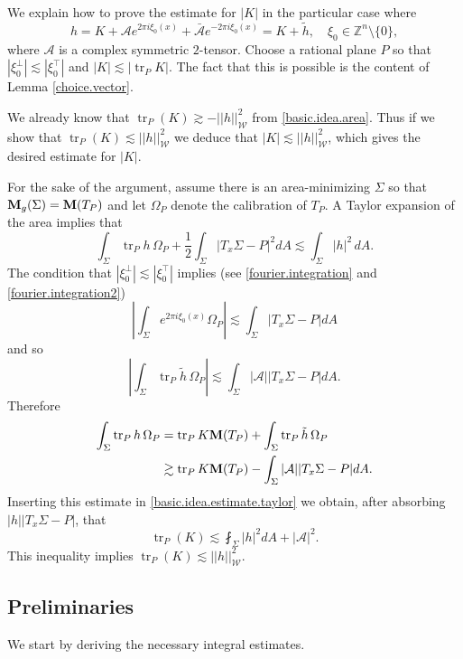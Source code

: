 \documentclass[11pt]{amsart}
\def\Z{\mathbb Z}
\def\tr{\operatorname{tr}}
\theoremstyle{remark}
\theoremstyle{definition}
\begin{document}
	
	{We }explain how to prove the estimate for $|K|$ in the particular case where $$h=K+\mathcal{A} e^{2\pi i \xi_0(x)}+\bar{\mathcal{A}}  e^{-2\pi i \xi_0(x)}=K+\tilde h,\quad\xi_0\in\Z^n\setminus\{0\},$$  where $\mathcal{A}$ is a complex symmetric $2$-tensor. Choose a rational plane $P$  so that $|\xi_0^{\bot}|\lesssim|\xi_0^{\top}|$ and $|K|\lesssim|\tr_P K|$. The fact that this is possible is the content of   Lemma \ref{choice.vector}. 
	
	We already know that $\tr_P(K)\gtrsim -||h||^2_{\mathcal W}$ from {\eqref{basic.idea.area}}. Thus if we show that $\tr_P(K)\lesssim ||h||^2_{\mathcal W}$ we deduce that $|K|\lesssim||h||^2_{\mathcal W}$, which gives the desired estimate  for $|K|$.  
	
	{For the sake of the argument,  assume} there is an area-minimizing $\Sigma$ so that ${\bf M}_{g}(\Sigma)={\bf M}(T_P)$ and let $\Omega_P$ denote the calibration of $T_P$. A Taylor expansion of the area implies that 
	\begin{equation}\label{basic.idea.estimate.taylor}
		\int_\Sigma\tr _P h\,\Omega_P+\frac12\int_\Sigma |T_x\Sigma- P|^2dA\lesssim \int_\Sigma |h|^2\,dA.
	\end{equation}
	The condition that $|\xi_0^{\bot}|\lesssim|\xi_0^{\top}|$ implies (see \eqref{fourier.integration} and \eqref{fourier.integration2})
	$$\left|\int_\Sigma e^{2\pi i \xi_0(x)}\Omega_P\right| \lesssim \int_\Sigma |T_x\Sigma- P|dA$$ 
	and so
	$$
	\left| \int_\Sigma\tr _P \tilde h\,\Omega_P\right| \lesssim \int_\Sigma |\mathcal{A}||T_x\Sigma- P|dA.$$
	Therefore
	\begin{align*}
		\int_\Sigma\tr _P h\,\Omega_P&=\tr _P K {\bf M}(T_P)+\int_\Sigma\tr _P \tilde h\,\Omega_P\\
		&\gtrsim \tr _P K {\bf M}(T_P)- \int_\Sigma |\mathcal{A}||T_x\Sigma- P|dA.
	\end{align*}
	Inserting this estimate in \eqref{basic.idea.estimate.taylor} we obtain, after absorbing $|h||T_x\Sigma- P|$, that
	$$\tr_P(K)\lesssim \fint_\Sigma|h|^2dA+|\mathcal{A}|^2.$$
	This inequality implies $\tr_P(K)\lesssim ||h||_{\mathcal W}^2$.
	
	\subsection{Preliminaries}
	We start by deriving the necessary integral estimates. 
	
\end{document}
